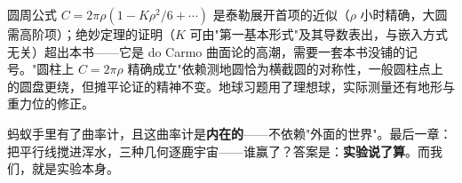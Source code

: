 \begin{chengshi}
圆周公式 $C = 2\pi\rho(1 - K\rho^2/6 + \cdots)$ 是泰勒展开首项的近似（$\rho$ 小时精确，大圆需高阶项）；绝妙定理的证明（$K$ 可由"第一基本形式"及其导数表出，与嵌入方式无关）超出本书——它是 do Carmo 曲面论的高潮，需要一套本书没铺的记号。"圆柱上 $C = 2\pi\rho$ 精确成立"依赖测地圆恰为横截圆的对称性，一般圆柱点上的圆盘更绕，但摊平论证的精神不变。地球习题用了理想球，实际测量还有地形与重力位的修正。
\end{chengshi}

蚂蚁手里有了曲率计，且这曲率计是\textbf{内在的}——不依赖"外面的世界"。最后一章：把平行线搅进浑水，三种几何逐鹿宇宙——谁赢了？答案是：\textbf{实验说了算}。而我们，就是实验本身。
